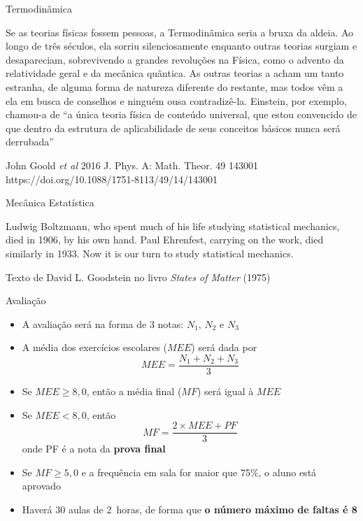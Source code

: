 \documentclass[t,%
brazilian,%
11pt,%
aspectratio=169,%
table%
]{beamer}
\begin{document}
\begin{frame}[c]{Termodinâmica}
    \begin{minipage}{\textwidth}
        \color{blue}
        Se as teorias físicas fossem pessoas, a Termodinâmica seria a bruxa da
        aldeia. Ao longo de três séculos, ela sorriu silenciosamente enquanto
        outras teorias surgiam e desapareciam, sobrevivendo a grandes
        revoluções na Física, como o advento da relatividade geral e da
        mecânica quântica. As outras teorias a acham um tanto estranha, de
        alguma forma de natureza diferente do restante, mas todos vêm a ela em
        busca de conselhos e ninguém ousa contradizê-la. Einstein, por exemplo,
        chamou-a de “a única teoria física de conteúdo universal, que estou
        convencido de que dentro da estrutura de aplicabilidade de seus
        conceitos básicos nunca será derrubada”
    \end{minipage}

    \vspace{1cm}
    John Goold \textit{et al} 2016 J. Phys. A: Math. Theor. 49 143001 \\
    https://doi.org/10.1088/1751-8113/49/14/143001
\end{frame}

\begin{frame}[c]{Mecânica Estatística}
    \begin{minipage}{\textwidth}
        \color{blue}
        Ludwig Boltzmann, who spent much of his life studying statistical
        mechanics, died in 1906, by his own hand. Paul Ehrenfest, carrying on the
        work, died similarly in 1933. Now it is our turn to study statistical
        mechanics.
    \end{minipage}

    \vspace{1cm}
    Texto de David L. Goodstein no livro \textit{States of Matter} (1975)
\end{frame}

\begin{frame}{Avaliação}
    \begin{itemize}
        \item A avaliação será na forma de 3 notas: \(N_1\), \(N_2\) e \(N_3\)
        \item A média dos exercícios escolares (\(MEE\)) será dada por
            \[
                MEE=\frac{N_1+N_2+N_3}{3}
            \]
        \item Se \(MEE \geq 8,0\), então a média final (\(MF\)) será igual à \(MEE\)
        \item Se \(MEE < 8,0\), então
            \[
                MF=\frac{2\times MEE+PF}{3}
            \]
            onde PF é a nota da \textbf{prova final}
        \item Se \(MF \geq 5,0\) e a frequência em sala for maior que 75\%, o aluno está aprovado
        \item Haverá 30 aulas de \SI{2}{horas}, de forma que \textbf{o número máximo de faltas é 8}
    \end{itemize}
\end{frame}
\end{document}
